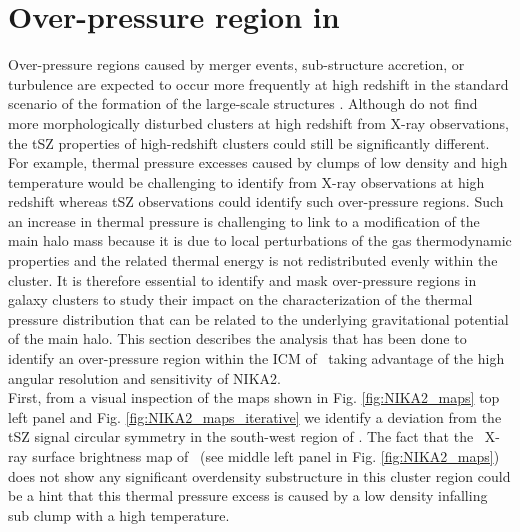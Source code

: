 \documentclass[traditabstract]{aa}
\begin{document}
\section{Over-pressure region in \psz}\label{sec:overp}
Over-pressure regions caused by merger events, sub-structure accretion, or turbulence are expected to occur more frequently at high redshift in the standard scenario of the formation of the large-scale structures \citep[see \emph{e.g.}][]{poo07}. Although \cite{mac17} do not find more morphologically disturbed clusters at high redshift from X-ray observations, the tSZ properties of high-redshift clusters could still be significantly different. For example, thermal pressure excesses caused by clumps of low density and high temperature would be challenging to identify from X-ray observations at high redshift whereas tSZ observations could identify such over-pressure regions. Such an increase in thermal pressure is challenging to link to a modification of the main halo mass because it is due to local perturbations of the gas thermodynamic properties and the related thermal energy is not redistributed evenly within the cluster. It is therefore essential to identify and mask over-pressure regions in galaxy clusters to study their impact on the characterization of the thermal pressure distribution that can be related to the underlying gravitational potential of the main halo. This section describes the analysis that has been done to identify an over-pressure region within the ICM of \psz\ taking advantage of the high angular resolution and sensitivity of NIKA2.\\
\indent First, from a visual inspection of the maps shown in Fig. \ref{fig:NIKA2_maps} top left panel and Fig. \ref{fig:NIKA2_maps_iterative} we identify a deviation from the tSZ signal circular symmetry in the south-west region of \psz. The fact that the \xmm\ X-ray surface brightness map of \psz\ (see middle left panel in Fig. \ref{fig:NIKA2_maps}) does not show any significant overdensity substructure in this cluster region could be a hint that this thermal pressure excess is caused by a low density infalling sub clump with a high temperature.\\
\end{document}
